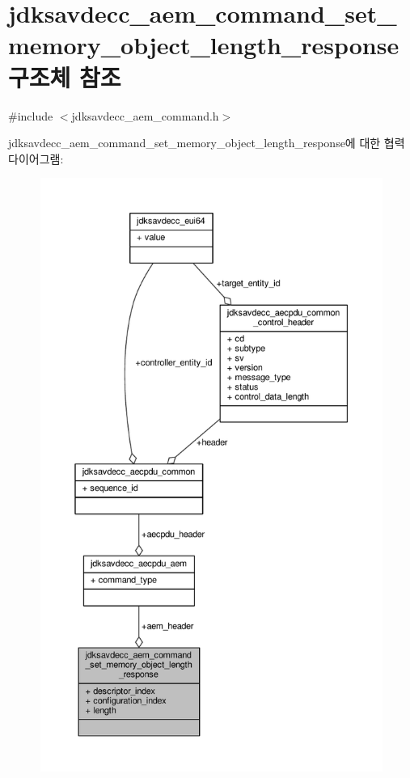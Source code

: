 \hypertarget{structjdksavdecc__aem__command__set__memory__object__length__response}{}\section{jdksavdecc\+\_\+aem\+\_\+command\+\_\+set\+\_\+memory\+\_\+object\+\_\+length\+\_\+response 구조체 참조}
\label{structjdksavdecc__aem__command__set__memory__object__length__response}


{\ttfamily \#include $<$jdksavdecc\+\_\+aem\+\_\+command.\+h$>$}



jdksavdecc\+\_\+aem\+\_\+command\+\_\+set\+\_\+memory\+\_\+object\+\_\+length\+\_\+response에 대한 협력 다이어그램\+:
\nopagebreak
\begin{figure}[H]
\begin{center}
\leavevmode
\includegraphics[height=550pt]{structjdksavdecc__aem__command__set__memory__object__length__response__coll__graph}
\end{center}
\end{figure}

